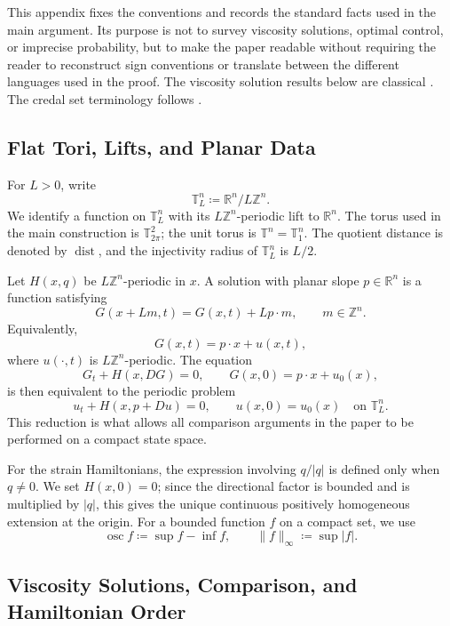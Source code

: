 \documentclass[11pt,reqno,noamsfonts]{amsart}
\theoremstyle{definition}
\theoremstyle{remark}
\newcommand{\R}{\mathbb R}
\newcommand{\T}{\mathbb T}
\newcommand{\dist}{\operatorname{dist}}
\newcommand{\osc}{\operatorname{osc}}
\begin{document}
This appendix fixes the conventions and records the standard facts used in the main argument. Its purpose is not to survey viscosity solutions, optimal control, or imprecise probability, but to make the paper readable without requiring the reader to reconstruct sign conventions or translate between the different languages used in the proof. The viscosity solution results below are classical \cite{BardiCapuzzoDolcetta1997,CrandallIshiiLions1992}. The credal set terminology follows \cite{AugustinEtAl2014,TroffaesDeCooman2014,Walley1991}.

\subsection{Flat Tori, Lifts, and Planar Data}\label{app:periodic}

For $L>0$, write
\[
  \T_L^n\coloneqq \R^n/L\mathbb Z^n.
\]
We identify a function on $\T_L^n$ with its $L\mathbb Z^n$-periodic lift to $\R^n$. The torus used in the main construction is $\T_{2\pi}^2$; the unit torus is $\T^n=\T_1^n$. The quotient distance is denoted by $\dist$, and the injectivity radius of $\T_L^n$ is $L/2$.

Let $H(x,q)$ be $L\mathbb Z^n$-periodic in $x$. A solution with planar slope $p\in\R^n$ is a function satisfying
\[
  G(x+Lm,t)=G(x,t)+L p\cdot m,
  \qquad m\in\mathbb Z^n.
\]
Equivalently,
\[
  G(x,t)=p\cdot x+u(x,t),
\]
where $u(\cdot,t)$ is $L\mathbb Z^n$-periodic. The equation
\[
  G_t+H(x,DG)=0,
  \qquad G(x,0)=p\cdot x+u_0(x),
\]
is then equivalent to the periodic problem
\begin{equation}\label{eq:periodic-correction-app}
  u_t+H(x,p+Du)=0,
  \qquad u(x,0)=u_0(x)
  \quad\text{on }\T_L^n.
\end{equation}
This reduction is what allows all comparison arguments in the paper to be performed on a compact state space.

For the strain Hamiltonians, the expression involving $q/|q|$ is defined only when $q\ne0$. We set $H(x,0)=0$; since the directional factor is bounded and is multiplied by $|q|$, this gives the unique continuous positively homogeneous extension at the origin.
For a bounded function $f$ on a compact set, we use
\[
  \osc f\coloneqq \sup f-\inf f,
  \qquad
  \|f\|_\infty\coloneqq \sup|f|.
\]

\subsection{Viscosity Solutions, Comparison, and Hamiltonian Order}\label{app:viscosity}
\end{document}
